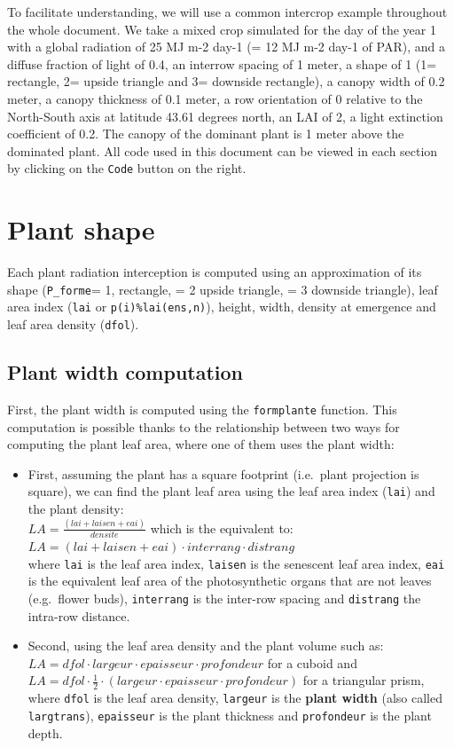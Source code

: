 \documentclass[]{book}
\theoremstyle{definition}
\theoremstyle{definition}
\theoremstyle{definition}
\theoremstyle{remark}
\begin{document}
To facilitate understanding, we will use a common intercrop example
throughout the whole document. We take a mixed crop simulated for the
day of the year 1 with a global radiation of 25 MJ m-2 day-1 (= 12 MJ
m-2 day-1 of PAR), and a diffuse fraction of light of 0.4, an interrow
spacing of 1 meter, a shape of 1 (1= rectangle, 2= upside triangle and
3= downside rectangle), a canopy width of 0.2 meter, a canopy thickness
of 0.1 meter, a row orientation of 0 relative to the North-South axis at
latitude 43.61 degrees north, an LAI of 2, a light extinction
coefficient of 0.2. The canopy of the dominant plant is 1 meter above
the dominated plant. All code used in this document can be viewed in
each section by clicking on the \texttt{Code} button on the right.

\section{Plant shape}\label{plant-shape}

Each plant radiation interception is computed using an approximation of
its shape (\texttt{P\_forme}= 1, rectangle, = 2 upside triangle, = 3
downside triangle), leaf area index (\texttt{lai} or
\texttt{p(i)\%lai(ens,n)}), height, width, density at emergence and leaf
area density (\texttt{dfol}).

\subsection{Plant width computation}\label{plant-width-computation}

First, the plant width is computed using the \texttt{formplante}
function. This computation is possible thanks to the relationship
between two ways for computing the plant leaf area, where one of them
uses the plant width:

\begin{itemize}
\item
  First, assuming the plant has a square footprint (i.e.~plant
  projection is square), we can find the plant leaf area using the leaf
  area index (\texttt{lai}) and the plant density:\\
  \(LA=\frac{\left(lai+laisen+eai\right)}{densite}\) which is the
  equivalent to:
  \(LA=\left(lai+laisen+eai\right)\cdot interrang\cdot distrang\)\\
  where \texttt{lai} is the leaf area index, \texttt{laisen} is the
  senescent leaf area index, \texttt{eai} is the equivalent leaf area of
  the photosynthetic organs that are not leaves (e.g.~flower buds),
  \texttt{interrang} is the inter-row spacing and \texttt{distrang} the
  intra-row distance.
\item
  Second, using the leaf area density and the plant volume such as:\\
  \(LA=dfol\cdot largeur\cdot epaisseur\cdot profondeur\) for a cuboid
  and
  \(LA=dfol\cdot\frac{1}{2}\cdot\left(largeur\cdot epaisseur\cdot profondeur\right)\)
  for a triangular prism, where \texttt{dfol} is the leaf area density,
  \texttt{largeur} is the \textbf{plant width} (also called
  \texttt{largtrans}), \texttt{epaisseur} is the plant thickness and
  \texttt{profondeur} is the plant depth.
\end{itemize}
\end{document}
